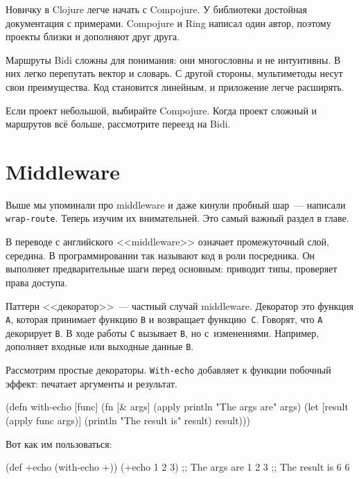 Новичку в Clojure легче начать с Compojure. У библиотеки достойная документация
с примерами. Compojure и Ring написал один автор, поэтому проекты близки и
дополняют друг друга.

Маршруты Bidi сложны для понимания: они многословны и не интуитивны. В них легко
перепутать вектор и словарь. С другой стороны, мультиметоды несут свои
преимущества. Код становится линейным, и приложение легче расширять.

Если проект небольшой, выбирайте Compojure. Когда проект сложный и маршрутов всё
больше, рассмотрите переезд на Bidi.

\section{Middleware}


Выше мы упоминали про middleware и даже кинули пробный шар~--- написали
\verb|wrap-route|. Теперь изучим их внимательней. Это самый важный раздел в
главе.

В переводе с английского <<middleware>> означает промежуточный слой, середина. В
программировании так называют код в роли посредника. Он выполняет
предварительные шаги перед основным: приводит типы, проверяет права доступа.

\label{decorator}


Паттерн <<декоратор>>~--- частный случай middleware. Декоратор это функция
\verb|А|, которая принимает функцию \verb|B| и возвращает
функцию~\verb|C|. Говорят, что \verb|A| декорирует \verb|B|. В ходе работы
\verb|C| вызывает \verb|B|, но с~изменениями. Например, дополняет входные
или выходные данные \verb|B|.

Рассмотрим простые декораторы. \verb|With-echo| добавляет к функции побочный
эффект: печатает аргументы и результат.

\begin{english}
  \begin{clojure}
(defn with-echo [func]
  (fn [& args]
    (apply println "The args are" args)
    (let [result (apply func args)]
      (println "The result is" result)
      result)))
  \end{clojure}
\end{english}

\noindent
Вот как им пользоваться:

\begin{english}
  \begin{clojure}
(def +echo (with-echo +))
(+echo 1 2 3)
;; The args are 1 2 3
;; The result is 6
6
  \end{clojure}
\end{english}

